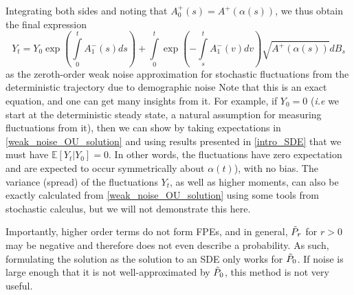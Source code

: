 Integrating both sides and noting that $A^+_0(s) = A^+(\alpha(s))$, we thus obtain the final expression
\begin{equation}
\label{weak_noise_OU_solution}
    Y_t = Y_0\exp\left({\int\limits_{0}^{t}A^-_1(s)ds}\right)+\int\limits_{0}^{t}\exp\left(-\int\limits_{s}^{t}A^-_{1}(v)dv\right)\sqrt{A^+(\alpha(s))}dB_s
\end{equation}
as the zeroth-order weak noise approximation for stochastic fluctuations from the deterministic trajectory due to demographic noise Note that this is an exact equation, and one can get many insights from it. For example, if $Y_0 = 0$ (\emph{i.e} we start at the deterministic steady state, a natural assumption for measuring fluctuations from it), then we can show by taking expectations in \eqref{weak_noise_OU_solution} and using results presented in \ref{intro_SDE} that we must have $\mathbb{E}[Y_t | Y_0] = 0$. In other words, the fluctuations have zero expectation and are expected to occur symmetrically about $\alpha(t)$), with no bias. The variance (spread) of the fluctuations $Y_t$, as well as higher moments, can also be exactly calculated from \eqref{weak_noise_OU_solution} using some tools from stochastic calculus, but we will not demonstrate this here.

Importantly, higher order terms do not form FPEs, and in general, $\Tilde{P}_r$ for $r>0$ may be negative and therefore does not even describe a probability. As such, formulating the solution as the solution to an SDE only works for $\Tilde{P}_0$. If noise is large enough that it is not well-approximated by $\Tilde{P}_0$, this method is not very useful.


